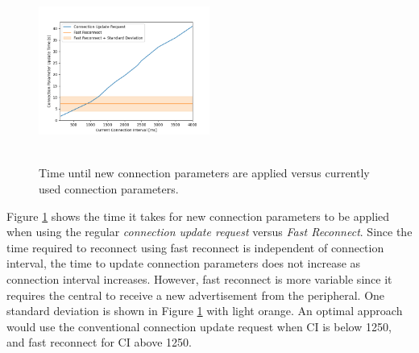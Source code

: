 \begin{figure}[]
    \centering
    \includegraphics[width=0.5\textwidth,height=6cm,keepaspectratio=true]{plots/static_conn_update_plot.png}
    \caption{
        Time until new connection parameters are applied versus currently used connection parameters.
    }
    \label{fig:static_conn_update_time}
\end{figure}

Figure \ref{fig:static_conn_update_time} shows the time it takes for new connection parameters to be applied when using the regular \textit{connection update request} versus \textit{Fast Reconnect}. Since the time required to reconnect using fast reconnect is independent of connection interval, the time to update connection parameters does not increase as connection interval increases. However, fast reconnect is more variable since it requires the central to receive a new advertisement from the peripheral. One standard deviation is shown in Figure \ref{fig:static_conn_update_time} with light orange. An optimal approach would use the conventional connection update request when CI is below 1250, and fast reconnect for CI above 1250.

